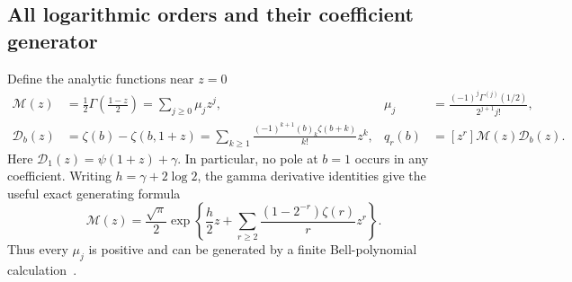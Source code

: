 \subsection{All logarithmic orders and their coefficient generator}

Define the analytic functions near $z=0$
\begin{align}
 \mathcal M(z)&=\frac12\Gamma\left(\frac{1-z}{2}\right)
       =\sum_{j\ge0}\mu_jz^j,
 &\mu_j&=\frac{(-1)^j\Gamma^{(j)}(1/2)}{2^{j+1}j!},
 \label{frac:eq:mu}\\
 \mathcal D_b(z)&=\zeta(b)-\zeta(b,1+z)
       =\sum_{k\ge1}\frac{(-1)^{k+1}(b)_k\zeta(b+k)}{k!}z^k,
 &q_r(b)&=[z^r]\mathcal M(z)\mathcal D_b(z).
 \label{frac:eq:q}
\end{align}
Here $\mathcal D_1(z)=\psi(1+z)+\gamma$. In particular, no pole at
$b=1$ occurs in any coefficient. Writing $h=\gamma+2\log2$, the
gamma derivative identities give the useful exact generating formula
\begin{equation}\label{frac:eq:bell}
 \mathcal M(z)=\frac{\sqrt\pi}{2}
  \exp\left\{\frac h2z+
       \sum_{r\ge2}\frac{(1-2^{-r})\zeta(r)}r z^r\right\}.
\end{equation}
Thus every $\mu_j$ is positive and can be generated by a finite
Bell-polynomial calculation~\cite{DLMFGamma}.

